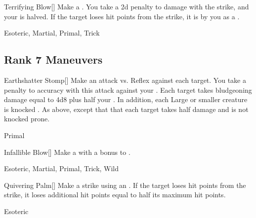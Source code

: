 \lowercase{\hypertarget{maneuver:Terrifying Blow}{}}\label{maneuver:Terrifying Blow}
\hypertarget{maneuver:Terrifying Blow}{}
\begin{freeability}[Rank 6]{Terrifying Blow}[]
Make a .
You take a \minus2d penalty to damage with the strike, and your  is halved.
If the target loses hit points from the strike, it is  by you as a .


 Esoteric, Martial, Primal, Trick
\end{freeability}
\vspace{0.25em}


\subsection{Rank 7 Maneuvers}

\lowercase{\hypertarget{maneuver:Earthshatter Stomp}{}}\label{maneuver:Earthshatter Stomp}
\hypertarget{maneuver:Earthshatter Stomp}{}
\begin{freeability}[Rank 7]{Earthshatter Stomp}[]
Make an attack vs. Reflex against each target.
You take a  penalty to accuracy with this attack against your .
\hit Each target takes bludgeoning damage equal to 4d8 plus half your .
In addition, each Large or smaller creature is knocked .
\glance As above, except that that each target takes half damage and is not knocked prone.


 Primal
\end{freeability}
\vspace{0.25em}



\lowercase{\hypertarget{maneuver:Infallible Blow}{}}\label{maneuver:Infallible Blow}
\hypertarget{maneuver:Infallible Blow}{}
\begin{freeability}[Rank 7]{Infallible Blow}[]
Make a  with a  bonus to .


 Esoteric, Martial, Primal, Trick, Wild
\end{freeability}
\vspace{0.25em}



\lowercase{\hypertarget{maneuver:Quivering Palm}{}}\label{maneuver:Quivering Palm}
\hypertarget{maneuver:Quivering Palm}{}
\begin{freeability}[Rank 7]{Quivering Palm}[]
Make a strike using an .
If the target loses hit points from the strike, it loses additional hit points equal to half its maximum hit points.


 Esoteric
\end{freeability}
\vspace{0.25em}



